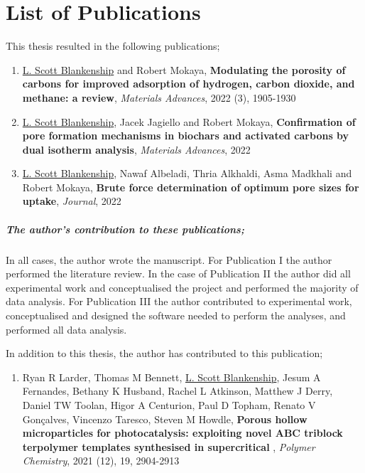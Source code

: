 \cleardoublepage
{}

\chapter*{List of Publications}

This thesis resulted in the following publications;

\begin{enumerate}[label=\Roman*]
    \item \underline{L. Scott Blankenship} and Robert Mokaya, \textbf{Modulating the porosity of carbons for improved adsorption of hydrogen, carbon dioxide, and methane: a review}, \textit{Materials Advances}, 2022 (3), 1905-1930
    \item \underline{L. Scott Blankenship}, Jacek Jagiello and Robert Mokaya, \textbf{Confirmation of pore formation mechanisms in biochars and activated carbons by dual isotherm analysis}, \textit{Materials Advances}, 2022
    \item \underline{L. Scott Blankenship}, Nawaf Albeladi, Thria Alkhaldi, Asma Madkhali and Robert Mokaya, \textbf{Brute force determination of optimum pore sizes for  uptake}, \textit{Journal}, 2022
    
\end{enumerate}

\paragraph{The author's contribution to these publications;}
In all cases, the author wrote the manuscript. For Publication I the author performed the literature review. In the case of Publication II the author did all experimental work and conceptualised the project and performed the majority of data analysis. For Publication III the author contributed to experimental work, conceptualised and designed the software needed to perform the analyses, and performed all data analysis.

\newpage
In addition to this thesis, the author has contributed to this publication;

\begin{enumerate}[resume, label=\Roman*]
    \item Ryan R Larder, Thomas M Bennett, \underline{L. Scott Blankenship}, Jesum A Fernandes, Bethany K Husband, Rachel L Atkinson, Matthew J Derry, Daniel TW Toolan, Higor A Centurion, Paul D Topham, Renato V Gonçalves, Vincenzo Taresco, Steven M Howdle, \textbf{Porous hollow  microparticles for photocatalysis: exploiting novel ABC triblock terpolymer templates synthesised in supercritical }, \textit{Polymer Chemistry}, 2021 (12), 19, 2904-2913
    
\end{enumerate}

